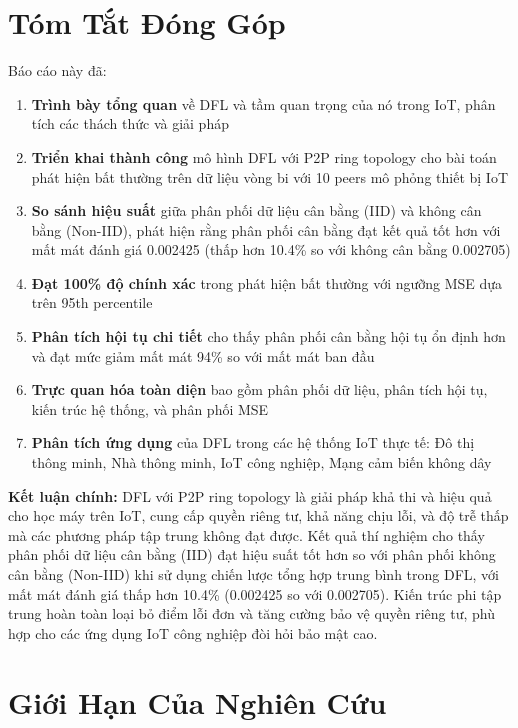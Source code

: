 
\section{Tóm Tắt Đóng Góp}

Báo cáo này đã:

\begin{enumerate}
    \item \textbf{Trình bày tổng quan} về DFL và tầm quan trọng của nó trong IoT, phân tích các thách thức và giải pháp
    \item \textbf{Triển khai thành công} mô hình DFL với P2P ring topology cho bài toán phát hiện bất thường trên dữ liệu vòng bi với 10 peers mô phỏng thiết bị IoT
    \item \textbf{So sánh hiệu suất} giữa phân phối dữ liệu cân bằng (IID) và không cân bằng (Non-IID), phát hiện rằng phân phối cân bằng đạt kết quả tốt hơn với mất mát đánh giá 0.002425 (thấp hơn 10.4\% so với không cân bằng 0.002705)
    \item \textbf{Đạt 100\% độ chính xác} trong phát hiện bất thường với ngưỡng MSE dựa trên 95th percentile
    \item \textbf{Phân tích hội tụ chi tiết} cho thấy phân phối cân bằng hội tụ ổn định hơn và đạt mức giảm mất mát 94\% so với mất mát ban đầu
    \item \textbf{Trực quan hóa toàn diện} bao gồm phân phối dữ liệu, phân tích hội tụ, kiến trúc hệ thống, và phân phối MSE
    \item \textbf{Phân tích ứng dụng} của DFL trong các hệ thống IoT thực tế: Đô thị thông minh, Nhà thông minh, IoT công nghiệp, Mạng cảm biến không dây
\end{enumerate}

\textbf{Kết luận chính:} DFL với P2P ring topology là giải pháp khả thi và hiệu quả cho học máy trên IoT, cung cấp quyền riêng tư, khả năng chịu lỗi, và độ trễ thấp mà các phương pháp tập trung không đạt được. Kết quả thí nghiệm cho thấy phân phối dữ liệu cân bằng (IID) đạt hiệu suất tốt hơn so với phân phối không cân bằng (Non-IID) khi sử dụng chiến lược tổng hợp trung bình trong DFL, với mất mát đánh giá thấp hơn 10.4\% (0.002425 so với 0.002705). Kiến trúc phi tập trung hoàn toàn loại bỏ điểm lỗi đơn và tăng cường bảo vệ quyền riêng tư, phù hợp cho các ứng dụng IoT công nghiệp đòi hỏi bảo mật cao.

\section{Giới Hạn Của Nghiên Cứu}

